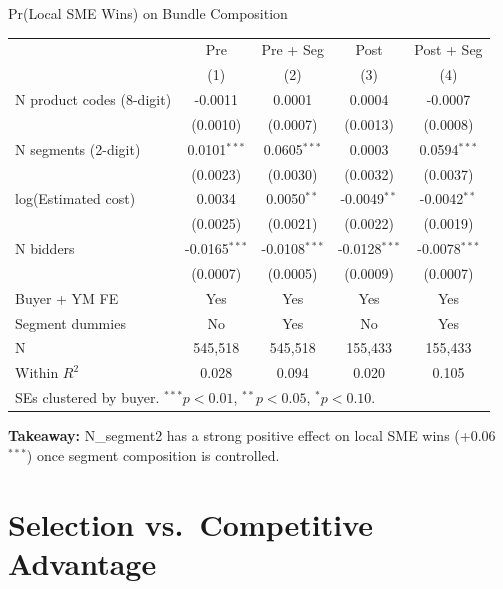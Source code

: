 \documentclass[9pt,aspectratio=169]{beamer}
\begin{document}
\begin{frame}{Pr(Local SME Wins) on Bundle Composition}
\centering\small
\begin{tabular}{lcccc}
\toprule
 & Pre & Pre + Seg & Post & Post + Seg \\
 & (1) & (2) & (3) & (4) \\
\midrule
N product codes (8-digit) & -0.0011 & 0.0001 & 0.0004 & -0.0007 \\
 & (0.0010) & (0.0007) & (0.0013) & (0.0008) \\[2pt]
N segments (2-digit) & 0.0101$^{***}$ & 0.0605$^{***}$ & 0.0003 & 0.0594$^{***}$ \\
 & (0.0023) & (0.0030) & (0.0032) & (0.0037) \\[2pt]
log(Estimated cost) & 0.0034 & 0.0050$^{**}$ & -0.0049$^{**}$ & -0.0042$^{**}$ \\
 & (0.0025) & (0.0021) & (0.0022) & (0.0019) \\[2pt]
N bidders & -0.0165$^{***}$ & -0.0108$^{***}$ & -0.0128$^{***}$ & -0.0078$^{***}$ \\
 & (0.0007) & (0.0005) & (0.0009) & (0.0007) \\[2pt]
\midrule
Buyer + YM FE & Yes & Yes & Yes & Yes \\
Segment dummies & No & Yes & No & Yes \\
N & 545,518 & 545,518 & 155,433 & 155,433 \\
Within $R^2$ & 0.028 & 0.094 & 0.020 & 0.105 \\
\bottomrule
\multicolumn{5}{l}{\footnotesize SEs clustered by buyer. $^{***}p<0.01$, $^{**}p<0.05$, $^{*}p<0.10$.} \\
\end{tabular}

\medskip
\small\textbf{Takeaway:} N\_segment2 has a strong positive effect on local SME wins (+0.06$^{***}$) once segment composition is controlled.
\end{frame}

\section{Selection vs.\ Competitive Advantage}
\end{document}
